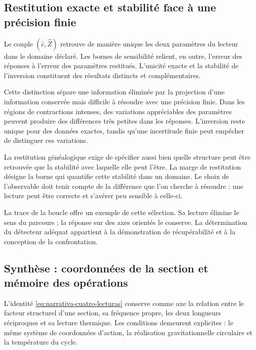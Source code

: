 \subsection{Restitution exacte et stabilité face à une précision finie}
\label{subsec:narrativa-estabilidad-restitucion}

Le couple $(\widehat c,\widehat Z)$ retrouve de manière unique les deux
paramètres du lecteur dans le domaine déclaré. Les bornes de
sensibilité relient, en outre, l’erreur des réponses à
l’erreur des paramètres restitués. L’unicité exacte et la
stabilité de l’inversion constituent des résultats distincts et
complémentaires.

Cette distinction sépare une information éliminée par la projection
d’une information conservée mais difficile à résoudre avec une précision
finie. Dans les régions de contractions intenses, des variations appréciables
des paramètres peuvent produire des différences très petites dans les
réponses. L’inversion reste unique pour des données exactes,
tandis qu’une incertitude finie peut empêcher de distinguer ces
variations.

La restitution généalogique exige de spécifier aussi bien quelle structure
peut être retrouvée que la stabilité avec laquelle elle peut l’être.
La marge de restitution désigne la borne qui quantifie cette stabilité
dans un domaine. Le choix de l’observable doit tenir compte de la différence
que l’on cherche à résoudre : une lecture peut être correcte et s’avérer
peu sensible à celle-ci.

La trace de la boucle offre un exemple de cette sélection. Sa lecture
élimine le sens du parcours ; la réponse sur des axes orientés
le conserve. La détermination du détecteur adéquat appartient à
la démonstration de récupérabilité et à la conception de la confrontation.

\subsection{Synthèse : coordonnées de la section et mémoire des opérations}
\label{subsec:narrativa-sintesis}

L’identité \eqref{eq:narrativa-cuatro-lecturas} conserve comme axe
la relation entre le facteur structurel d’une section, sa fréquence
propre, les deux longueurs réciproques et sa lecture thermique. Les conditions
demeurent explicites : le même système de coordonnées d’action, la réalisation
gravitationnelle circulaire et la température du cycle.

